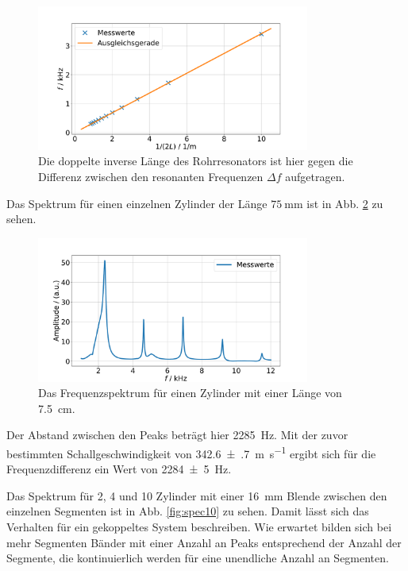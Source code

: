 \begin{figure}
    \centering
    \includegraphics[width=0.8\textwidth]{plots/A_2.pdf}
    \caption{Die doppelte inverse Länge des Rohrresonators ist hier gegen die Differenz zwischen den resonanten Frequenzen $\Delta f$ aufgetragen.}
    \label{fig:speed}
\end{figure}

Das Spektrum für einen einzelnen Zylinder der Länge $\SI{75}{\milli\metre}$ ist in Abb. \ref{fig:A3} zu sehen.
\begin{figure}
    \centering
    \includegraphics[width=0.8\textwidth]{plots/A_3.pdf}
    \caption{Das Frequenzspektrum für einen Zylinder mit einer Länge von \SI{7.5}{\centi\metre}.}
    \label{fig:A3}
\end{figure}

Der Abstand zwischen den Peaks beträgt hier \SI{2285}{\hertz}. 
Mit der zuvor bestimmten Schallgeschwindigkeit von \SI{342.6(7)}{\meter\per\second} ergibt sich für die Frequenzdifferenz ein Wert von \SI{2284(5)}{\hertz}.

Das Spektrum für \num{2}, \num{4} und \num{10} Zylinder mit einer \SI{16}{\milli\meter} Blende zwischen den einzelnen Segmenten ist in Abb. \ref{fig:spec10} zu sehen. Damit lässt sich das Verhalten für ein gekoppeltes System beschreiben. Wie erwartet bilden sich bei mehr Segmenten Bänder mit einer Anzahl an Peaks entsprechend der Anzahl der Segmente, die kontinuierlich werden für eine unendliche Anzahl an Segmenten. 

